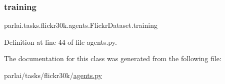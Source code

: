\subsubsection{\texorpdfstring{training}{training}}
{\footnotesize\ttfamily parlai.\+tasks.\+flickr30k.\+agents.\+Flickr\+Dataset.\+training}



Definition at line 44 of file agents.\+py.



The documentation for this class was generated from the following file\+:\begin{DoxyCompactItemize}
\item 
parlai/tasks/flickr30k/\hyperlink{parlai_2tasks_2flickr30k_2agents_8py}{agents.\+py}\end{DoxyCompactItemize}
